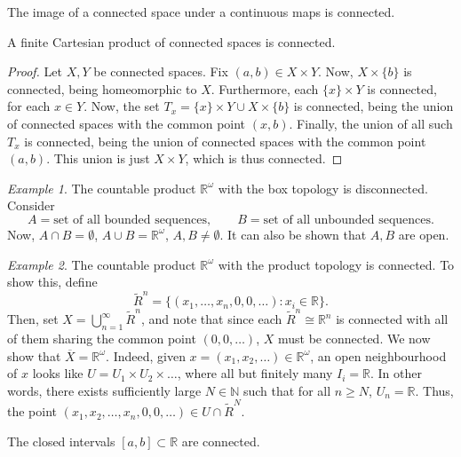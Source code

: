 \documentclass[11pt]{article}
\newcommand{\R}{\mathbb{R}}
\newcommand{\N}{\mathbb{N}}
\theoremstyle{definition}
\theoremstyle{remark}
\newtheorem*{example}{Example}
\numberwithin{equation}{section}
\begin{document}
    \begin{theorem}
        The image of a connected space under a continuous maps is connected.
    \end{theorem}

    \begin{theorem}
        A finite Cartesian product of connected spaces is connected.
    \end{theorem}
    \begin{proof}
        Let $X, Y$ be connected spaces. Fix $(a, b) \in X \times Y$. Now, $X\times
        \{b\}$ is connected, being homeomorphic to $X$. Furthermore, each $\{x\}
        \times Y$ is connected, for each $x \in Y$. Now, the set $T_x = \{x\} \times
        Y \cup X\times \{b\}$ is connected, being the union of connected spaces with
        the common point $(x, b)$. Finally, the union of all such $T_x$ is connected,
        being the union of connected spaces with the common point $(a, b)$. This
        union is just $X\times Y$, which is thus connected.
    \end{proof}
    \begin{example}
        The countable product $\R^\omega$ with the box topology is disconnected.
        Consider \[
            A = \text{set of all bounded sequences}, \qquad
            B = \text{set of all unbounded sequences}.
        \] Now, $A \cap B = \emptyset$, $A\cup B = \R^\omega$, $A, B \neq \emptyset$.
        It can also be shown that $A, B$ are open.
    \end{example}
    \begin{example}
        The countable product $\R^\omega$ with the product topology is connected. To
        show this, define \[
            \tilde{R}^n = \{(x_1, \dots, x_n, 0, 0, \dots): x_i \in \R\}.
        \] Then, set $X = \bigcup_{n = 1}^\infty \tilde{R}^n$, and note that since
        each $\tilde{R}^n \cong \R^n$ is connected with all of them sharing the
        common point $(0, 0, \dots)$, $X$ must be connected. We now show that
        $\overline{X} = \R^\omega$. Indeed, given $x = (x_1, x_2, \dots) \in \R^\omega$,
        an open neighbourhood of $x$ looks like $U = U_1 \times U_2 \times \dots$,
        where all but finitely many $I_i = \R$. In other words, there exists
        sufficiently large $N \in \N$ such that for all $n \geq N$, $U_n = \R$. Thus,
        the point $(x_1, x_2, \dots, x_n, 0, 0, \dots) \in U \cap \tilde{R}^N$.
    \end{example}

    \begin{lemma}
        The closed intervals $[a, b] \subset \R$ are connected.
    \end{lemma}
\end{document}
